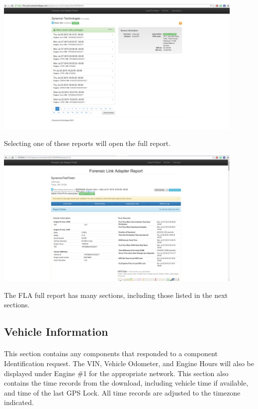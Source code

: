 \documentclass[11pt, oneside]{book}
\begin{document}
\begin{center}
\includegraphics[width=0.9\textwidth]{../media/fla_portal_screenshots/user_landing_page}
\end{center}

Selecting one of these reports will open the full report.

\begin{center}
\includegraphics[width=0.9\textwidth]{../media/fla_portal_screenshots/full_report/top}
\end{center}

The FLA full report has many sections, including those listed in the next sections.


\subsection{Vehicle Information}
\paragraph{  }
This section contains any components that responded to a component
Identification request. The VIN, Vehicle Odometer, and Engine Hours
will also be displayed under Engine \#1 for the appropriate network.
This section also contains the time records from the download, including vehicle time
if available, and time of the last GPS Lock. All time records are adjusted to the timezone indicated.
\end{document}
